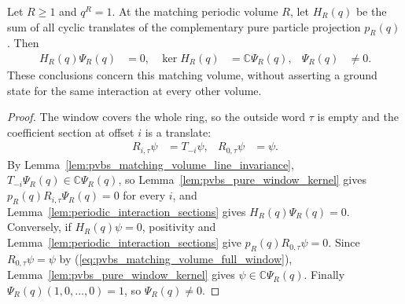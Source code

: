 \begin{lemma}
    \label{lem:pvbs_matching_volume_kernel}
    \leanok
    Let $R\ge1$ and $q^R=1$. At the matching periodic volume $R$, let
    $H_R(q)$ be the sum of all cyclic translates of the complementary
    pure particle projection $p_R(q)$. Then
    \begin{align}
        H_R(q)\Psi_R(q) & =0,   & \ker H_R(q) & =\mathbb C\Psi_R(q), &
        \Psi_R(q)       & \ne0.
    \end{align}
    These conclusions concern this matching volume, without asserting
    a ground state for the same interaction at every other volume.
\end{lemma}
\begin{proof}
    \leanok
    The window covers the whole ring, so the outside word $\tau$ is empty
    and the coefficient section at offset $i$ is a translate:
    \begin{align}
        R_{i,\tau}\psi & =T_{-i}\psi, & R_{0,\tau}\psi & =\psi.
        \label{eq:pvbs_matching_volume_full_window}
    \end{align}
    By
    Lemma~\ref{lem:pvbs_matching_volume_line_invariance},
    $T_{-i}\Psi_R(q)\in\mathbb C\Psi_R(q)$, so
    Lemma~\ref{lem:pvbs_pure_window_kernel} gives
    $p_R(q)R_{i,\tau}\Psi_R(q)=0$ for every $i$, and
    Lemma~\ref{lem:periodic_interaction_sections} gives
    $H_R(q)\Psi_R(q)=0$. Conversely, if $H_R(q)\psi=0$, positivity and
    Lemma~\ref{lem:periodic_interaction_sections} give
    $p_R(q)R_{0,\tau}\psi=0$. Since $R_{0,\tau}\psi=\psi$ by
    (\ref{eq:pvbs_matching_volume_full_window}),
    Lemma~\ref{lem:pvbs_pure_window_kernel} gives
    $\psi\in\mathbb C\Psi_R(q)$. Finally
    $\Psi_R(q)(1,0,\ldots,0)=1$, so $\Psi_R(q)\ne0$.
\end{proof}

